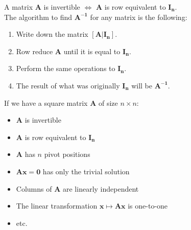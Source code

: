 \documentclass[nobib]{tufte-handout}
\begin{document}
A matrix \textbf{A} is invertible $\iff$ \textbf{A} is row equivalent to $\mathbf{I_n}$.\\
The algorithm to find $\mathbf{A^{-1}}$ for any matrix is the following:
\begin{enumerate}
    \item Write down the matrix $\mathbf{[A|I_n]}$.
    \item Row reduce \textbf{A} until it is equal to $\mathbf{I_n}$.
    \item Perform the same operations to $\mathbf{I_n}$.
    \item The result of what was originally $\mathbf{I_n}$ will be $\mathbf{A^{-1}}$.
\end{enumerate}
If we have a square matrix $\mathbf{A}$ of size $n\times n$:
\begin{itemize}
    \item $\mathbf{A}$ is invertible
    \item $\mathbf{A}$ is row equivalent to $\mathbf{I_n}$
    \item $\mathbf{A}$ has $n$ pivot positions
    \item $\mathbf{Ax = 0}$ has only the trivial solution
    \item Columns of \textbf{A} are linearly independent
    \item The linear transformation $\mathbf{x\mapsto Ax}$ is one-to-one
    \item etc.
\end{itemize}
\end{document}
